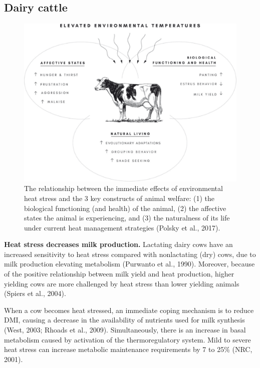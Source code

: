 \documentclass[]{book}
\begin{document}
\subsection{Dairy cattle}\label{dairy-cattle}

\begin{figure}

{\centering \includegraphics[width=1\linewidth]{figures/heatstress-dairy} 

}

\caption{The relationship between the immediate effects of environmental heat stress and the 3 key constructs of animal welfare: (1) the biological functioning (and health) of the animal, (2) the affective states the animal is experiencing, and (3) the naturalness of its life under current heat management strategies (Polsky et al., 2017).}\label{fig:heat-dairy}
\end{figure}

\textbf{Heat stress decreases milk production.} Lactating dairy cows
have an increased sensitivity to heat stress compared with nonlactating
(dry) cows, due to milk production elevating metabolism (Purwanto et
al., 1990). Moreover, because of the positive relationship between milk
yield and heat production, higher yielding cows are more challenged by
heat stress than lower yielding animals (Spiers et al., 2004).

When a cow becomes heat stressed, an immediate coping mechanism is to
reduce DMI, causing a decrease in the availability of nutrients used for
milk synthesis (West, 2003; Rhoads et al., 2009). Simultaneously, there
is an increase in basal metabolism caused by activation of the
thermoregulatory system. Mild to severe heat stress can increase
metabolic maintenance requirements by 7 to 25\% (NRC, 2001).
\end{document}
